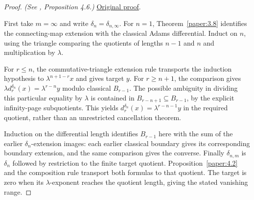 \begin{proof}
\textit{(See \cite{LWX126}, Proposition 4.6.)} \href{paper/main.tex.html#L1087}{Original proof}.

First take $m=\infty$ and write $\delta_n=\delta_{n,\infty}$. For $n=1$, Theorem~\ref{paper:3.8} identifies the connecting-map extension with the classical Adams differential. Induct on $n$, using the triangle comparing the quotients of lengths $n-1$ and $n$ and multiplication by $\lambda$.

For $r\le n$, the commutative-triangle extension rule transports the induction hypothesis to $\lambda^{n+1-r}x$ and gives target $y$. For $r\ge n+1$, the comparison gives $\lambda d_r^{\delta_n}(x)=\lambda^{r-n}y$ modulo classical $B_{r-1}$. The possible ambiguity in dividing this particular equality by $\lambda$ is contained in $B_{r-n+1}\subseteq B_{r-1}$, by the explicit infinity-page subquotients. This yields $d_r^{\delta_n}(x)=\lambda^{r-n-1}y$ in the required quotient, rather than an unrestricted cancellation theorem.

Induction on the differential length identifies $B_{r-1}$ here with the sum of the earlier $\delta_n$-extension images: each earlier classical boundary gives its corresponding boundary extension, and the same comparison gives the converse. Finally $\delta_{n,m}$ is $\delta_n$ followed by restriction to the finite target quotient. Proposition~\ref{paper:4.2} and the composition rule transport both formulas to that quotient. The target is zero when its $\lambda$-exponent reaches the quotient length, giving the stated vanishing range.
\end{proof}

